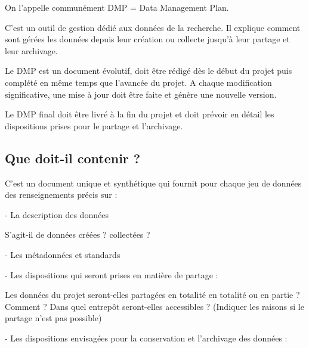 \documentclass[14pt,oneside]{article}
\begin{document}
\begin{flushleft}
On l'appelle communément DMP = Data Management Plan.
\end{flushleft}

\begin{flushleft}
C’est un outil de gestion dédié aux données de la recherche. Il explique comment sont gérées les données depuis leur création ou collecte jusqu’à leur partage et leur archivage.
\end{flushleft}

\begin{flushleft}
Le DMP est un document évolutif, doit être rédigé dès le début du projet puis complété en même temps que l’avancée du projet. A chaque modification significative, une mise à jour doit être faite et génère une nouvelle version.
\end{flushleft}

\begin{flushleft}
Le DMP final doit être livré à la fin du projet et doit prévoir en détail les dispositions prises pour le partage et l’archivage.
\end{flushleft}

\subsection*{Que doit-il contenir ?}

\begin{flushleft}
C’est un document unique et synthétique qui fournit pour chaque jeu de données des renseignements précis sur :
\end{flushleft}

-	La description des données

\begin{flushleft}
S’agit-il de données créées ? collectées ?
\end{flushleft}

-	Les métadonnées et standards

-	Les dispositions qui seront prises en matière de partage :

\begin{flushleft}
Les données du projet seront-elles partagées en totalité en totalité ou en partie ? Comment ? Dans quel entrepôt seront-elles accessibles ? (Indiquer les raisons si le partage n’est pas possible)
\end{flushleft}

\newpage

-	Les dispositions envisagées pour la conservation et l’archivage des données :
\end{document}
